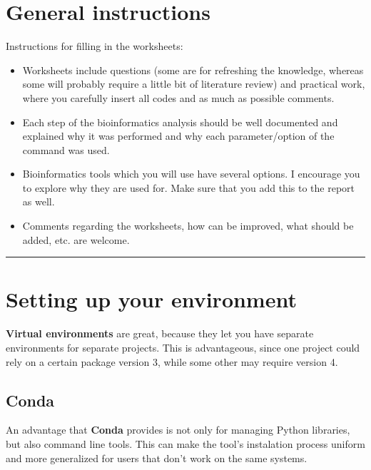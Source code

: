


\hypertarget{general-instructions}{%
\section{General instructions}\label{general-instructions}}

Instructions for filling in the worksheets:

\begin{itemize}
\item
  Worksheets include questions (some are for refreshing the knowledge,
  whereas some will probably require a little bit of literature review)
  and practical work, where you carefully insert all codes and as much
  as possible comments.
\item
  Each step of the bioinformatics analysis should be well documented and
  explained why it was performed and why each parameter/option of the
  command was used.
\item
  Bioinformatics tools which you will use have several options. I
  encourage you to explore why they are used for. Make sure that you add
  this to the report as well.
\item
  Comments regarding the worksheets, how can be improved, what should be
  added, etc. are welcome.
\end{itemize}

\begin{center}\rule{0.5\linewidth}{0.5pt}\end{center}

\hypertarget{setting-up-your-environment}{%
\section{Setting up your
environment}\label{setting-up-your-environment}}

\textbf{Virtual environments} are great, because they let you have
separate environments for separate projects. This is advantageous, since
one project could rely on a certain package version 3, while some other
may require version 4.

\hypertarget{conda}{%
\subsection{Conda}\label{conda}}

An advantage that \textbf{Conda} provides is not only for managing
Python libraries, but also command line tools. This can make the tool's
instalation process uniform and more generalized for users that don't
work on the same systems.

